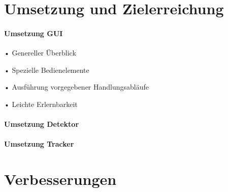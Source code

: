 \section{Umsetzung und Zielerreichung}

\paragraph{Umsetzung GUI}
•	Genereller Überblick

•	Spezielle Bedienelemente

•	Ausführung vorgegebener Handlungsabläufe

•	Leichte Erlernbarkeit


\paragraph{Umsetzung Detektor}

\paragraph{Umsetzung Tracker}

\section{Verbesserungen}
